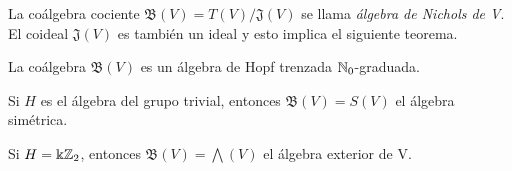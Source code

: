 \documentclass[a4paper,oneside,fleqn,11pt,../tesis.tex]{subfiles}
\begin{document}
\begin{definition}
	La coálgebra cociente $\mathfrak{B}(V) = T(V)/\mathfrak{J}(V)$ se llama \emph{álgebra de Nichols de V}. El coideal $\mathfrak{J}(V)$ es también un 		ideal y esto implica el siguiente teorema.
\end{definition}

\begin{Teorema}
	La coálgebra $\mathfrak{B}(V)$ es un álgebra de Hopf trenzada $\mathbb{N}_{0}$-graduada.
\end{Teorema}

\begin{example}
	Si $H$ es el álgebra del grupo trivial, entonces $\mathfrak{B}(V) = S(V)$ el álgebra simétrica.
\end{example}

\begin{example}
	Si $H = \Bbbk \mathbb{Z}_{2}$, entonces $\mathfrak{B}(V) = \bigwedge(V)$ el álgebra exterior de V.
\end{example}
\end{document}
